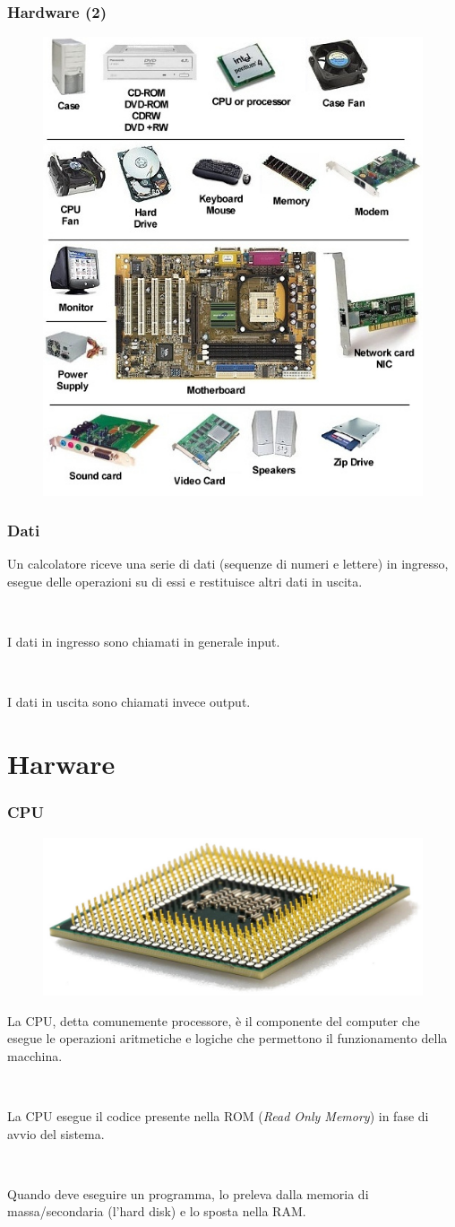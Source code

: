 \documentclass[handout]{beamer}
\begin{document}
\begin{frame}
\frametitle{Hardware (2)}
\begin{figure}
  \includegraphics[width=.5\columnwidth]{img/hardware2.jpg}
\end{figure}
\end{frame}


\begin{frame}
\frametitle{Dati}
Un calcolatore riceve una serie di dati (sequenze di numeri e lettere) in ingresso, \alert<1>{esegue delle operazioni} su di essi e restituisce altri dati in uscita.\pause

~

I dati in ingresso sono chiamati in generale \alert<2>{input}.\pause

~

I dati in uscita sono chiamati invece \alert<3>{output}.
\end{frame}

\section{Harware}


\begin{frame}
\frametitle{CPU}
\begin{figure}
  \includegraphics[width=.4\columnwidth]{img/cpu.jpg}
\end{figure}
La CPU, detta comunemente \alert<1>{processore}, è il componente del computer che esegue le operazioni aritmetiche e logiche che permettono il funzionamento della macchina.\pause

~

La CPU esegue il codice presente nella ROM (\emph{Read Only Memory}) in fase di avvio del sistema.\pause

~

Quando deve eseguire un programma, lo preleva dalla memoria di massa/secondaria (l'hard disk) e lo sposta nella RAM.
\end{frame}
\end{document}
